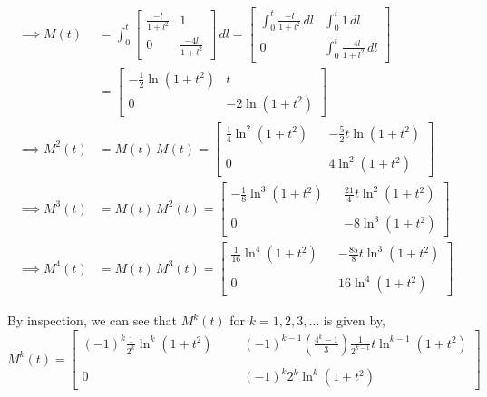 \begin{align*}
    \implies
    M(t)
     & =
    \int_{0}^{t}
    \begin{bmatrix}
        \frac{-l}{1+l^2} & 1                 \\
        0                & \frac{-4l}{1+l^2}
    \end{bmatrix}
    \, dl
    =
    \begin{bmatrix}
        \int_{0}^{t} \frac{-l}{1+l^2} \, dl
         &
        \int_{0}^{t} 1 \, dl
        \\
        0
         &
        \int_{0}^{t} \frac{-4l}{1+l^2} \, dl
    \end{bmatrix}
    \\ & =
    \begin{bmatrix}
        -\frac{1}{2} \ln(1+t^2)
         &
        t
        \\
        0
         &
        -2 \ln(1+t^2)
    \end{bmatrix}
    \\
    \implies
    M^2(t)
     & =
    M(t) \, M(t)
    =
    \begin{bmatrix}
        \frac{1}{4} \ln^2(1+t^2)
         &  &
        -\frac{5}{2} t \ln(1+t^2)
        \\ \\
        0
         &  &
        4 \ln^2(1+t^2)
    \end{bmatrix}
    \\
    \implies
    M^3(t)
     & =
    M(t) \, M^2(t)
    =
    \begin{bmatrix}
        -\frac{1}{8} \ln^3(1+t^2)
         &  &
        \frac{21}{4} t \ln^2(1+t^2)
        \\ \\
        0
         &  &
        -8 \ln^3(1+t^2)
    \end{bmatrix}
    \\
    \implies
    M^4(t)
     & =
    M(t) \, M^3(t)
    =
    \begin{bmatrix}
        \frac{1}{16} \ln^4(1+t^2)
         &  &
        -\frac{85}{8} t \ln^3(1+t^2)
        \\ \\
        0
         &  &
        16 \ln^4(1+t^2)
    \end{bmatrix}
\end{align*}

By inspection, we can see that \( M^{k} (t) \) for \( k = 1, 2, 3, \ldots \) is given by,
\begin{equation*}
    M^{k} (t)
    =
    \begin{bmatrix}
        \displaystyle
        {(-1)}^{k} \frac{1}{2^k} \ln^{k}(1+t^2)
         &  &  &
        \displaystyle
        {(-1)}^{k-1} \left( \frac{4^k-1}{3} \right) \frac{1}{2^{k-1}} t \ln^{k-1}(1+t^2)
        \\ \\
        0
         &  &  &
        \displaystyle
        {(-1)}^{k} 2^{k} \ln^{k}(1+t^2)
    \end{bmatrix}
\end{equation*}

